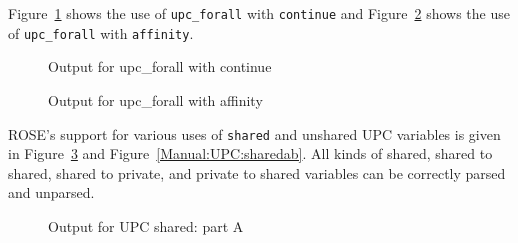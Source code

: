 Figure~\ref{Manual:UPC:forall1} shows the use of \lstinline{upc_forall}
with \lstinline{continue} and Figure~\ref{Manual:UPC:forall2} shows the use
of \lstinline{upc_forall} with \lstinline{affinity}.

\begin{figure}[!h]
{\indent
  {\mySmallFontSize
    \begin{latexonly}
    
    \end{latexonly}
    \begin{htmlonly}
    
    \end{htmlonly}
  }
}
\caption{Output for upc\_forall with continue}
\label{Manual:UPC:forall1}
\end{figure}

\begin{figure}[!h]
{\indent
  {\mySmallFontSize
    \begin{latexonly}
    
    \end{latexonly}
    \begin{htmlonly}
    
    \end{htmlonly}
  }
}
\caption{Output for upc\_forall with affinity }
\label{Manual:UPC:forall2}
\end{figure}

\clearpage
ROSE's support for various uses of \lstinline{shared} and unshared UPC
variables is given in
Figure~\ref{Manual:UPC:sharedaa} and Figure~\ref{Manual:UPC:sharedab}. 
All kinds of shared, shared to shared, shared to private, and private to
shared variables can be correctly parsed and unparsed.
\begin{figure}[!h]
{\indent
  {\mySmallFontSize
    \begin{latexonly}
    
    \end{latexonly}
    \begin{htmlonly}
    
    \end{htmlonly}
  }
}
\caption{Output for UPC shared: part A}
\label{Manual:UPC:sharedaa}
\end{figure}

